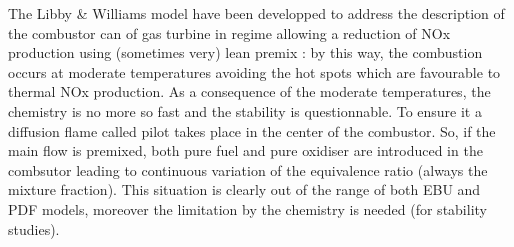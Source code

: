 The Libby \& Williams model have been developped to address the
description of the combustor can of gas turbine in regime allowing a
reduction of NOx production using ({\small sometimes very}) lean
premix : by this way, the combustion occurs at moderate temperatures
avoiding the hot spots which are favourable to thermal NOx
production. As a consequence of the moderate temperatures, the
chemistry is no more so fast and the stability is questionnable. To
ensure it a diffusion flame called pilot takes place in the center of
the combustor. So, if the main flow is premixed, both pure fuel and
pure oxidiser are introduced in the combsutor leading to continuous
variation of the equivalence ratio ({\small always the mixture
fraction}). This situation is clearly out of the range of both EBU and
PDF models, moreover the limitation by the chemistry is needed
({\small for stability studies}).\\

